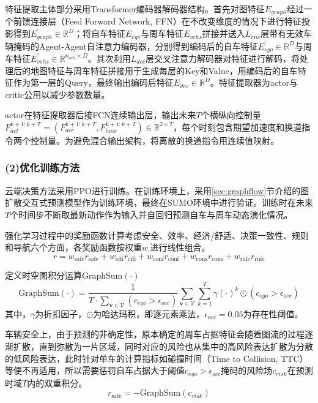       特征提取主体部分采用Transformer编码器解码器结构。首先对图特征$E_{graph}$经过一个前馈连接层（Feed Forward Network, FFN）在不改变维度的情况下进行特征投影得到$E^{\prime}_{graph}\in\mathbb{R}^{D}$；将自车特征$E_{ego}$与周车特征$E_{vehs}$拼接并送入$L_{enc}$层带有无效车辆掩码的Agent-Agent自注意力编码器，分别得到编码后的自车特征$E_{ego}^{\prime}\in\mathbb{R}^{D}$与周车特征$E_{vehs}^{\prime}\in\mathbb{R}^{n_{veh}\times D}$。其次利用$L_{dec}$层交叉注意力解码器对特征进行解码，将处理后的地图特征与周车特征拼接用于生成每层的Key和Value，用编码后的自车特征作为第一层的Query，最终输出编码后特征$E_{dec}\in\mathbb{R}^{D}$。特征提取器为actor与critic公用以减少参数数量。

      actor在特征提取器后接FCN连续输出层，输出未来$T$个横纵向控制量$F_{act}^{k+1:k+T} = \left(F_{acc}^{k+1:k+T}, F_{lane}^{k+1:k+T}\right)\in\mathbb{R}^{2\times T}$，每个时刻包含期望加速度和换道指令两个控制量。为避免混合输出架构，将离散的换道指令用连续值映射。

    \subsubsection*{(2)优化训练方法}
      云端决策方法采用PPO进行训练。在训练环境上，采用\ref{sec:graphflow}节介绍的图扩散交互式预测模型作为训练环境，最终在SUMO环境中进行验证。训练时在未来$T$个时间步不断取最新动作作为输入并自回归预测自车与周车动态演化情况。
      
      强化学习过程中的奖励函数计算考虑安全、效率、经济/舒适、决策一致性、规则和导航六个方面，各奖励函数按权重$w_{\cdot}$进行线性组合。
      \begin{equation}
        r = w_{\text{safe}}r_{\text{safe}} + w_{\text{effi}}r_{\text{effi}} + w_{\text{conf}}r_{\text{conf}} + w_{\text{cons}}r_{\text{cons}} + w_{\text{rule}}r_{\text{rule}}
      \end{equation}
      

      定义时空图积分运算$\text{GraphSum}(\cdot)$
      \begin{equation}
        \text{GraphSum}(\cdot) = \frac{1}{T\cdot \sum_{\mathbf{v}\in\mathcal{V}}(c_{ego} > \epsilon_{occ})}\sum_{\mathbf{v}\in\mathcal{V}} \sum_{k=1}^{T} \gamma (\cdot)^{k} \odot (c_{ego} > \epsilon_{occ})
      \end{equation}
      \noindent 其中，$\gamma$为折扣因子，$\odot$为哈达玛积，即逐元素乘法，$\epsilon_{occ}=0.05$为存在性阈值。

      车辆安全上，由于预测的非确定性，原本确定的周车占据特征会随着图流的过程逐渐扩散，直到弥散为一片区域，同时对应的风险也从集中的高风险表达扩散为分散的低风险表达，此时针对单车的计算指标如碰撞时间（Time to Collision, TTC）等便不再适用，所以需要惩罚自车占据大于阈值$c_{ego}>\epsilon_{occ}$掩码的风险场$c_{risk}$在预测时域$T$内的双重积分。
      \begin{equation}
        r_{\text{safe}} = - \text{GraphSum}(c_{risk})
      \end{equation}

